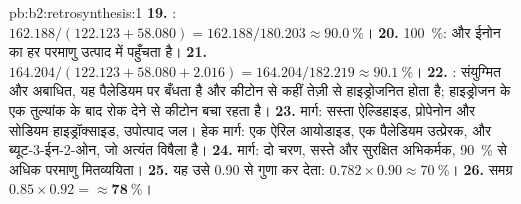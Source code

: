 \begin{solution}{pb:b2:retrosynthesis:1}
\textbf{19.} : $162.188/(122.123 + 58.080) = 162.188/180.203
\approx 90.0~\%$।
\textbf{20.} 100~\%:  और ईनोन का हर परमाणु उत्पाद में पहुँचता है।
\textbf{21.} $164.204/(122.123 + 58.080 + 2.016) = 164.204/182.219 \approx 90.1~\%$।
\textbf{22.} : संयुग्मित और अबाधित, यह पैलेडियम पर बँधता है और कीटोन  से कहीं
तेज़ी से हाइड्रोजनित होता है; हाइड्रोजन के एक तुल्यांक के बाद रोक देने से कीटोन बचा रहता है।
\textbf{23.}  मार्ग: सस्ता ऐल्डिहाइड, प्रोपेनोन और सोडियम हाइड्रॉक्साइड, उपोत्पाद जल। हेक
मार्ग: एक ऐरिल आयोडाइड, एक पैलेडियम उत्प्रेरक, और ब्यूट-3-ईन-2-ओन, जो अत्यंत विषैला है।
\textbf{24.}  मार्ग: दो चरण, सस्ते और सुरक्षित अभिकर्मक, 90~\% से अधिक परमाणु मितव्ययिता।
\textbf{25.} यह उसे 0.90 से गुणा कर देता: $0.782 \times 0.90 \approx 70~\%$।
\textbf{26.} समग्र $0.85 \times 0.92 = \boldsymbol{\approx 78~\%}$।
\end{solution}

